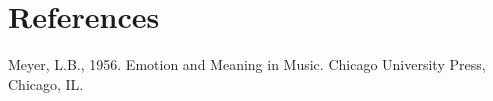 \documentclass[final,authoryear,11pt,times]{elsarticle}
\begin{document}






\section{References}
Meyer, L.B., 1956. Emotion and Meaning in Music. Chicago University Press, Chicago, IL.
\end{document}
